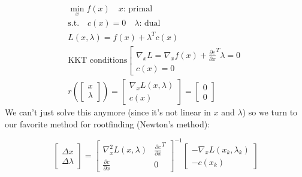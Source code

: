 \begin{equation}
    \begin{gathered}
        \min_{x} f( x) \quad x\text{: primal}\\
        \text{s.t.} \quad c( x) =0\quad \lambda \text{: dual}\\
        L( x,\lambda ) =f( x) +\lambda ^{T} c( x)\\
        \text{KKT conditions}\left[\begin{matrix}
        \nabla _{x} L=\nabla _{x} f( x) +\frac{\partial c}{\partial x}^{T} \lambda =0\\
        c( x) =0
        \end{matrix}\right. \\
        r\left(\begin{bmatrix}
        x\\
        \lambda 
        \end{bmatrix}\right) =\begin{bmatrix}
        \nabla _{x} L( x,\lambda )\\
        c( x)
        \end{bmatrix} =\begin{bmatrix}
        0\\
        0
        \end{bmatrix}
    \end{gathered}
\end{equation}
We can't just solve this anymore (since it's not linear in $x$ and $\lambda$) so we turn to our favorite method for rootfinding (Newton's method):

\begin{equation}
    \begin{bmatrix}
    \Delta x\\
    \Delta \lambda 
    \end{bmatrix} =\begin{bmatrix}
    \nabla _{x}^{2} L( x,\lambda ) & \frac{\partial c}{\partial x}^{T}\\
    \frac{\partial c}{\partial x} & 0
    \end{bmatrix}^{-1}\begin{bmatrix}
    -\nabla _{x} L( x_{k} ,\lambda _{k})\\
    -c( x_{k})
    \end{bmatrix}
\end{equation}

